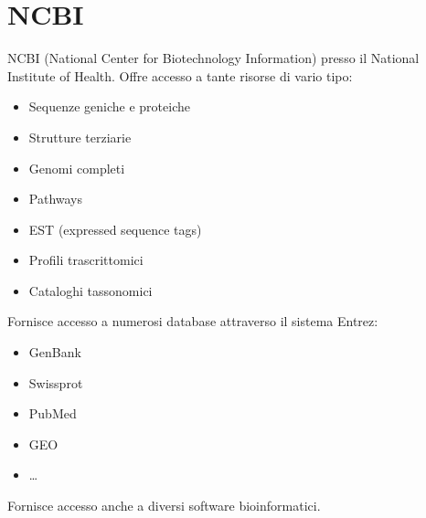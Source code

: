 \documentclass{article}
\begin{document}
\section{NCBI}
NCBI (National Center for Biotechnology Information) presso il National Institute of Health. Offre accesso a tante risorse di vario tipo:
\begin{itemize}
    \item Sequenze geniche e proteiche
    \item Strutture terziarie
    \item Genomi completi
    \item Pathways
    \item EST (expressed sequence tags)
    \item Profili trascrittomici
    \item Cataloghi tassonomici
\end{itemize}
Fornisce accesso a numerosi database attraverso il sistema Entrez:
\begin{itemize}
    \item GenBank
    \item Swissprot
    \item PubMed
    \item GEO 
    \item \dots
\end{itemize}
Fornisce accesso anche a diversi software bioinformatici.
\end{document}
